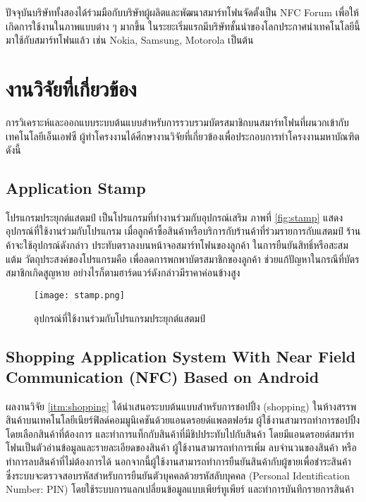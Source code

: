 \documentclass[a4paper]{article}
\begin{document}
ปัจจุบันบริษัททั้งสองได้ร่วมมือกับบริษัทผู้ผลิตและพัฒนาสมาร์ทโฟนจัดตั้งเป็น NFC Forum เพื่อให้เกิดการใช้งานในภาพแบบต่าง ๆ มากขึ้น ในระยะเริ่มแรกมีบริษัทชั้นนำของโลกประกาศนำเทคโนโลยีนี้มาใช้กับสมาร์ทโฟนแล้ว เช่น Nokia, Samsung, Motorola เป็นต้น


\section{งานวิจัยที่เกี่ยวข้อง}
การวิเคราะห์และออกแบบระบบต้นแบบสำหรับการรวบรวมบัตรสมาชิกบนสมาร์ทโฟนที่ผนวกเข้ากับเทคโนโลยีเอ็นเอฟซี ผู้ทำโครงงานได้ศึกษางานวิจัยที่เกี่ยวข้องเพื่อประกอบการทําโครงงานมหาบัณฑิต ดังนี้

\subsection{Application Stamp}
โปรแกรมประยุกต์แสตมป์ เป็นโปรแกรมที่ทำงานร่วมกับอุปกรณ์เสริม ภาพที่ \ref{fig:stamp} แสดงอุปกรณ์ที่ใช้งานร่วมกับโปรแกรม เมื่อลูกค้าซื้อสินค้าหรือบริการกับร้านค้าที่ร่วมรายการกับแสตมป์ ร้านค้าจะใช้อุปกรณ์ดังกล่าว ประทับตราลงบนหน้าจอสมาร์ทโฟนของลูกค้า ในการยืนยันสิทธิ์หรือสะสมแต้ม วัตถุประสงค์ของโปรแกรมคือ เพื่อลดการพกพาบัตรสมาชิกของลูกค้า ช่วยแก้ปัญหาในกรณีที่บัตรสมาชิกเกิดสูญหาย  อย่างไรก็ตามฮาร์ดแวร์ดังกล่าวมีราคาค่อนข้างสูง

\begin{figure}[ht!]
\centering
\texttt{[image: stamp.png]}
\caption{อุปกรณ์ที่ใช้งานร่วมกับโปรแกรมประยุกต์แสตมป์} \label{fig:stamp}
\label{overflow}
\end{figure}

\subsection{Shopping Application System With Near Field Communication (NFC) Based on Android}
ผลงานวิจัย \ref{itm:shopping} ได้นำเสนอระบบต้นแบบสำหรับการชอปปิ้ง (shopping) ในห้างสรรพสินค้าบนเทคโนโลยีเนียร์ฟิลด์คอมมูนิเคชันด้วยแอนดรอยด์แพลตฟอร์ม ผู้ใช้งานสามารถทำการชอปปิ้งโดยเลือกสินค้าที่ต้องการ และทำการแท็กกับสินค้าที่มีชิปประทับไปกับสินค้า โดยมีแอนดรอยด์สมาร์ทโฟนเป็นตัวอ่านข้อมูลและรายละเอียดของสินค้า ผู้ใช้งานสามารถทำการเพิ่ม ลบจำนวนของสินค้า หรือทำการลบสินค้าที่ไม่ต้องการได้ นอกจากนี้ผู้ใช้งานสามารถทำการยืนยันสินค้ากับผู้ขายเพื่อชำระสินค้า ซึ่งระบบจะตรวจสอบรหัสสำหรับการยืนยันตัวบุคคลด้วยรหัสลับบุคคล (Personal Identification Number: PIN) โดยใช้ระบบการแลกเปลี่ยนข้อมูลแบบเพียร์ทูเพียร์ และทำการบันทึกรายการสินค้า
\end{document}
